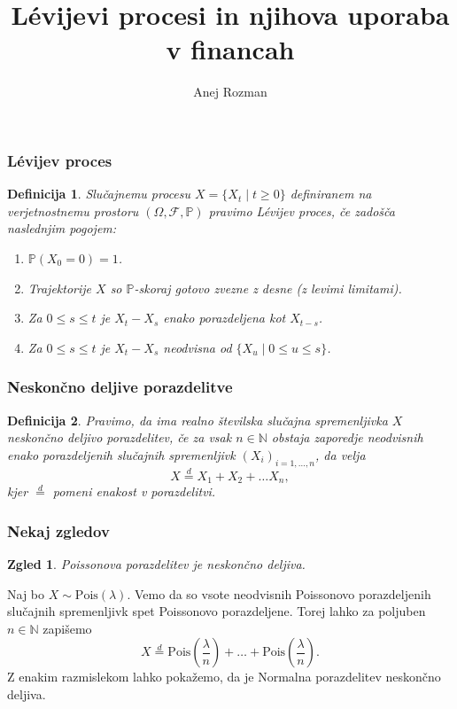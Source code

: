 \documentclass[]{beamer} %
\title{Lévijevi procesi in njihova uporaba v financah}
\subtitle{}
\author[Anej Rozman]{Anej Rozman}
\institute[]{Mentor: doc.~dr. Martin Raič}
\date[]{}
\theoremstyle{plain}
\newtheorem{definicija}{Definicija}
\newtheorem{zgled}{Zgled}
\begin{document}
\frame{\titlepage}

\begin{frame}
  \frametitle{Lévijev proces}
  \begin{definicija}
      Slučajnemu procesu $X = \{X_t \mid t \geq 0\}$ definiranem na verjetnostnemu
      prostoru $(\Omega, \mathcal{F}, \mathds{P})$ pravimo \textit{Lévijev proces}, če zadošča naslednjim pogojem:
      \begin{enumerate}
          \item $\mathds{P}(X_0 = 0)=1$.
          \item Trajektorije $X$ so $\mathds{P}$-skoraj gotovo zvezne z desne (z levimi limitami).
          \item Za $0 \leq s \leq t$ je $X_t - X_s$ enako porazdeljena kot $X_{t-s}$.
          \item Za $0 \leq s \leq t$ je $X_t - X_s$ neodvisna od $\{X_u \mid 0 \leq u \leq s\}$.
      \end{enumerate}
  \end{definicija}
\end{frame}

\begin{frame}
  \frametitle{Neskončno deljive porazdelitve}
  \begin{definicija}
    Pravimo, da ima realno številska slučajna spremenljivka $X$ \textit{neskončno deljivo porazdelitev}, če
    za vsak $n \in \mathbb{N}$ obstaja zaporedje neodvisnih enako porazdeljenih 
    slučajnih spremenljivk $\left(X_i\right)_{i=1,\dots,n}$, da velja
    $$
    X \stackrel{d}{=} X_1 + X_2 + \dots X_n,
    $$
    kjer $\stackrel{d}{=}$ pomeni enakost v porazdelitvi.
\end{definicija}


  \end{frame}

\begin{frame}
  \frametitle{Nekaj zgledov}
  \begin{zgled}
    Poissonova porazdelitev je neskončno deljiva.
  \end{zgled}
  \pause
    Naj bo $X \sim \text{Pois}(\lambda)$. Vemo da so vsote neodvisnih Poissonovo
    porazdeljenih slučajnih spremenljivk spet Poissonovo porazdeljene. Torej lahko za poljuben 
    $n\in\mathbb{N}$ zapišemo
    $$
      X \stackrel{d}{=} \text{Pois}(\frac{\lambda}{n}) + \dots + \text{Pois}(\frac{\lambda}{n}).
    $$
  \pause
  Z enakim razmislekom lahko pokažemo, da je Normalna porazdelitev neskončno deljiva.
\end{frame}
\end{document}
